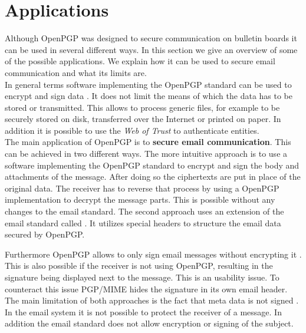 \section{Applications} \label{section:openpgp:applications}

Although OpenPGP was designed to secure communication on bulletin boards it can be used in several different ways. In this section we give an overview of some of the possible applications. We explain how it can be used to secure email communication and what its limits are.  \\


In general terms software implementing the OpenPGP standard can be used to encrypt and sign data \cite[section 2]{RFC4880}. It does not limit the means of which the data has to be stored or transmitted. This allows to process generic files, for example to be securely stored on disk, transferred over the Internet or printed on paper. In addition it is possible to use the \textit{Web of Trust} to authenticate entities. \\  


The main application of OpenPGP is to \textbf{secure email communication}. This can be achieved in two different ways. The more intuitive approach is to use a software implementing the OpenPGP standard to encrypt and sign the body and attachments of the message. After doing so the ciphertexts are put in place of the original data. The receiver has to reverse that process by using a OpenPGP implementation to decrypt the message parts. This is possible without any changes to the email standard. The second approach uses an extension of the email standard called  \citep{RFC3156}. It utilizes special headers to structure the email data secured by OpenPGP.

Furthermore OpenPGP allows to only sign email messages without encrypting it \cite[section 7]{RFC4880}. This is also possible if the receiver is not using OpenPGP, resulting in the signature being displayed next to the message. This is an usability issue. To counteract this issue PGP/MIME hides the signature in its own email header. \\


The main limitation of both approaches is the fact that meta data is not signed \cite{Green2014}. In the email system it is not possible to protect the receiver of a message. In addition the email standard does not allow encryption or signing of the subject. \\

